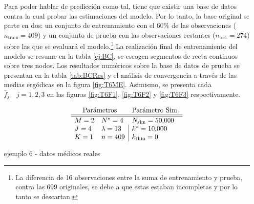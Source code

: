 \documentclass[../Main/Main.tex]{subfiles}
\begin{document}
Para poder hablar de predicción como tal, tiene que existir una base de datos contra la cual probar las estimaciones del modelo. Por lo tanto, la base original se parte en dos: un conjunto de entrenamiento con el $60\%$ de las observaciones ($n_{\text{train}} = 409$) y un conjunto de prueba con las observaciones restantes ($n_{\text{test}} = 274$) sobre las que se evaluará el modelo.\footnote{La diferencia de 16 observaciones entre la suma de entrenamiento y prueba, contra las 699 originales, se debe a que estas estaban incompletas y por lo tanto se descartan.} La realización final de entrenamiento del modelo se resume en la tabla \ref{ej:BC}, se escogen segmentos de recta continuos sobre tres nodos. Los resultados numéricos sobre la base de datos de prueba se presentan en la tabla \ref{tab:BCRes} y el análisis de convergencia a través de las medias ergódicas en la figura \ref{fig:T6ME}. Asimismo, se presenta cada $\hat{f}_j\quad j = 1,2,3$ en las figuras \ref{fig:T6F1}, \ref{fig:T6F2} y \ref{fig:T6F3} respectivamente.
\begin{table}[ht]
$$\paramsmod{2}{4}{1}{4}{13}{409}{\num{50000}}{\num{10000}}{0}$$
\caption{ejemplo 6 - datos médicos reales}
\label{ej:BC}
\end{table}
\end{document}
